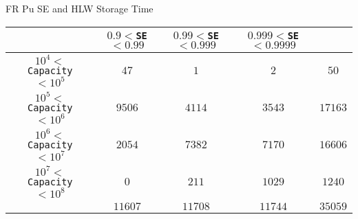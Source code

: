 
\begin{slide}{FR Pu SE and HLW Storage Time}
\begin{center}
\tiny
\begin{tabular}{|c||c|c|c||c|}
\hline
&$0.9<$\texttt{SE}$<0.99$&$0.99<$\texttt{SE}$<0.999$&$0.999<$\texttt{SE}$< 0.9999$&\\
\hline
$10^4 <$ \texttt{Capacity} $< 10^5$&$47$&$1$&$2$&$50$\\
\hline
$10^5 <$ \texttt{Capacity} $< 10^6$&$9506$&$4114$&$3543$&$17163$\\
\hline
$10^6 <$ \texttt{Capacity} $< 10^7$&$2054$&$7382$&$7170$&$16606$\\
\hline
$10^7 <$ \texttt{Capacity} $< 10^8$&$0$&$211$&$1029$&$1240$\\
\hline
&$11607$&$11708$&$11744$&$35059$\\
\hline
\end{tabular}
\end{center}
\end{slide}

